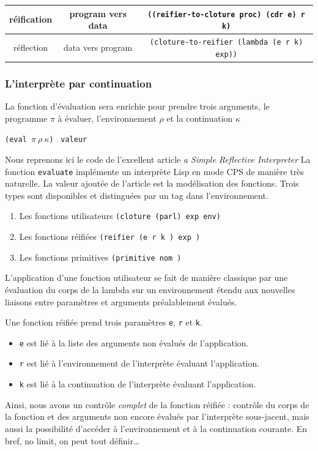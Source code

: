 \begin{tabular}{c|c|c} \hline
réification & program vers data &  \texttt{((reifier-to-cloture proc) (cdr e) r k)}   \\ \hline
réflection  & data vers program & \texttt{(cloture-to-reifier (lambda (e r k) exp))} \\ \hline
\end{tabular}


\subsubsection{L'interprète par continuation }
La fonction d'évaluation sera enrichie pour prendre trois arguments, le programme $\pi$ à évaluer, l'environnement 
$\rho$ et la continuation $\kappa$ 
\begin{center}
\texttt{(eval $\pi\ \rho\ \kappa$)} \imp\  \texttt{valeur}
\end{center}

Nous reprenons ici le code de l'excellent article \textit{a Simple Reflective Interpreter} \cite{reflective}
La fonction \texttt{evaluate} implémente un interprète Lisp en mode CPS de manière très naturelle.
La valeur ajoutée de l'article est la modélisation des fonctions. Trois types sont disponibles et 
distinguées par un tag dans l'environnement.
\begin{enumerate}
  \item Les fonctions utilisateurs \texttt{(cloture (parl) exp env)}
  \item Les fonctions réifiées \texttt{(reifier (e r k ) exp )}
  \item Les fonctions primitives \texttt{(primitive nom )}
\end{enumerate}
L'application d'une fonction utilisateur se fait de manière classique par une évaluation du corps
de la lambda sur un environnement étendu aux nouvelles liaisons entre paramètres et arguments préalablement évalués.

Une fonction réifiée prend trois paramètres \texttt{e}, \texttt{r} et \texttt{k}.
\begin{itemize}
  \item  \texttt{e} est lié à la liste des arguments non évalués de l'application.
  \item \texttt{r} est lié à l'environnement de l'interprète évaluant l'application.
  \item \texttt{k} est lié à la continuation de l'interprète évaluant l'application.
\end{itemize}
Ainsi, nous avons un contrôle \textit{complet} de la fonction réifiée : contrôle du corps de la fonction et des arguments
non encore évalués par l'interprète sous-jacent, mais aussi la possibilité d'accéder à l'environnement et à la continuation
courante. En bref, no limit, on peut tout définir\dots

